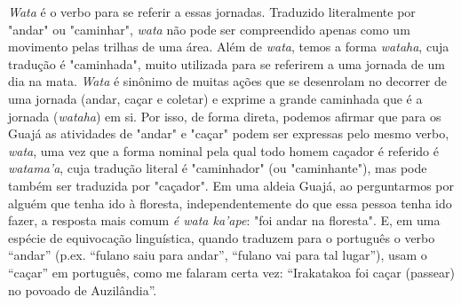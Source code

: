 \emph{Wata} é o verbo para se referir a essas jornadas. Traduzido
literalmente por "andar" ou "caminhar", \emph{wata} não pode ser
compreendido apenas como um movimento pelas trilhas de uma área. Além de
\emph{wata}, temos a forma \emph{wataha}, cuja tradução é "caminhada",
muito utilizada para se referirem a uma jornada de um dia na mata.
\emph{Wata} é sinônimo de muitas ações que se desenrolam no decorrer de
uma jornada (andar, caçar e coletar) e exprime a grande caminhada que é
a jornada (\emph{wataha}) em si. Por isso, de forma direta, podemos
afirmar que para os Guajá as atividades de "andar" e "caçar" podem ser
expressas pelo mesmo verbo, \emph{wata}, uma vez que a forma nominal
pela qual todo homem caçador é referido é \emph{watama'a}, cuja tradução
literal é "caminhador" (ou "caminhante"), mas pode também ser traduzida
por "caçador". Em uma aldeia Guajá, ao perguntarmos por alguém que tenha
ido à floresta, independentemente do que essa pessoa tenha ido fazer, a
resposta mais comum \emph{é wata ka'ape}: "foi andar na floresta". E, em
uma espécie de equivocação linguística, quando traduzem para o português
o verbo ``andar'' (p.ex. ``fulano saiu para andar'', ``fulano vai para
tal lugar''), usam o ``caçar'' em português, como me falaram certa vez:
``Irakatakoa foi caçar (passear) no povoado de Auzilândia''.

